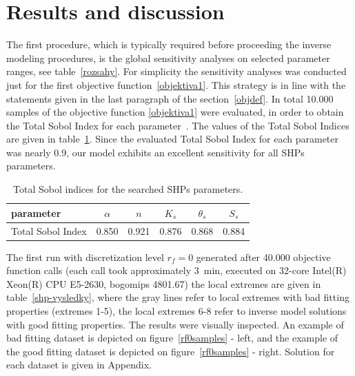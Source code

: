\documentclass[review]{elsarticle}
\begin{document}

 



\section{Results and discussion} 


The first procedure, which is typically required before proceeding the inverse modeling procedures, is the global sensitivity analyses on  selected parameter ranges, see table~\ref{rozsahy}. For simplicity the sensitivity analyses was conducted just for the first objective function~\eqref{objektiva1}. This strategy is in line with the statements given in the last paragraph of the section~\ref{objdef}. In total 10.000 samples of the objective function \eqref{objektiva1}  were evaluated, in order to obtain the  Total Sobol Index for each parameter~\citep{kniha-citlivost}. The values of the Total Sobol Indices are given in table~\ref{citlivost}. Since the evaluated Total Sobol Index for each parameter was nearly 0.9, our model exhibits an excellent sensitivity for all SHPs parameters. 

\begin{table}[ht]
\begin{center}
\caption{Total Sobol indices for the searched SHPs parameters.}
\begin{small}
\doublespacing
\begin{tabular}{l||c c c c c}
\toprule
parameter & $\alpha$ & $n$ & $K_s$ & $\theta_s$ & $S_s$ \\ \hline
\toprule
Total Sobol Index & 0.850 & 0.921 & 0.876 & 0.868 & 0.884 \\
\toprule
\end{tabular}
\end{small}
\label{citlivost}
\end{center}
\end{table}

The first run with discretization level $r_f=0$ generated after 40.000 objective function calls (each call took approximately 3~min, executed on 32-core Intel(R) Xeon(R) CPU E5-2630, bogomips 4801.67) the local extremes are given in table~\ref{shp-vysledky}, where the gray lines refer to local extremes with bad fitting properties (extremes 1-5), the local extremes 6-8 refer to inverse model solutions with good fitting properties. The results were visually inspected. An example of bad fitting dataset is depicted on figure~\ref{rf0samples} - left, and the example of the good fitting dataset is depicted on figure~\ref{rf0samples} - right. Solution for each dataset is  given in Appendix.
\end{document}
